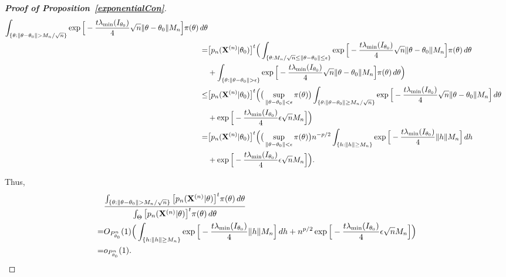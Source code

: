 \documentclass[3p]{elsarticle}
\theoremstyle{plain}
\theoremstyle{definition}
\theoremstyle{remark}
\begin{document}
\begin{appendices}
\begin{proof}[\textbf{Proof of Proposition~\ref{exponentialCon}}]
$$\begin{aligned}
        \int_{\{\theta:\|\theta-\theta_0\|> M_n/\sqrt{n}\}} 
        \exp\Big[-\frac{t\lambda_{\min}(I_{\theta_0})}{4}\sqrt{n}\|\theta-\theta_0\|M_n\Big]
        \pi(\theta)\, d\theta
        \\
        =&
        \big[p_n(\BX^{(n)}|\theta_0)\big]^t 
        \Big(
        \int_{\{\theta:M_n/\sqrt{n}\leq \|\theta-\theta_0\|\leq \epsilon \}} 
        \exp\Big[-\frac{t\lambda_{\min}(I_{\theta_0})}{4}\sqrt{n}\|\theta-\theta_0\|M_n\Big]
        \pi(\theta)\, d\theta
        \\
        &+
        \int_{\{\theta:\|\theta-\theta_0\|> \epsilon\}} 
        \exp\Big[-\frac{t\lambda_{\min}(I_{\theta_0})}{4}\sqrt{n}\|\theta-\theta_0\|M_n\Big]
        \pi(\theta)\, d\theta
        \Big)
        \\
        \leq& 
        \big[p_n(\BX^{(n)}|\theta_0)\big]^t 
        \Big(
        \big(\sup_{\|\theta-\theta_0\|<\epsilon}\pi(\theta)\big)
        \int_{\{\theta: \|\theta-\theta_0\|\geq M_n/\sqrt{n}\}} 
        \exp\Big[-\frac{t\lambda_{\min}(I_{\theta_0})}{4}\sqrt{n}\|\theta-\theta_0\|M_n\Big]
        \, d\theta
        \\
        &+
        \exp\Big[-\frac{t\lambda_{\min}(I_{\theta_0})}{4}\epsilon\sqrt{n}M_n\Big]
        \Big)
        \\
        =& 
        \big[p_n(\BX^{(n)}|\theta_0)\big]^t 
        \Big(
        \big(\sup_{\|\theta-\theta_0\|<\epsilon}\pi(\theta)\big)
        n^{-p/2}
        \int_{\{h: \|h\|\geq M_n\}} 
        \exp\Big[-\frac{t\lambda_{\min}(I_{\theta_0})}{4}\|h\| M_n\Big]
        \, dh
        \\
        &+
        \exp\Big[-\frac{t\lambda_{\min}(I_{\theta_0})}{4}\epsilon\sqrt{n}M_n\Big]
        \Big).
    \end{aligned}
$$

Thus,
$$
    \begin{aligned}
        &\frac{
            \int_{\{\theta:\|\theta-\theta_0\|> M_n/\sqrt{n}\}} \big[p_n(\BX^{(n)}|\theta)\big]^t \pi(\theta)\, d\theta
        }
        {
            \int_{\Theta} \big[p_n(\BX^{(n)}|\theta)\big]^t \pi(\theta)\, d\theta
        }
        \\
        =&
        O_{P_{\theta_0}^n}(1)
        \Big(
        \int_{\{h: \|h\|\geq M_n\}} 
        \exp\Big[-\frac{t\lambda_{\min}(I_{\theta_0})}{4}\|h\| M_n\Big]
        \, dh
        +
        n^{p/2}\exp\Big[-\frac{t\lambda_{\min}(I_{\theta_0})}{4}\epsilon\sqrt{n}M_n\Big]
        \Big)
        \\
        =&o_{P^n_{\theta_0}}(1).
    \end{aligned}
$$


\end{proof}
\end{appendices}
\end{document}
